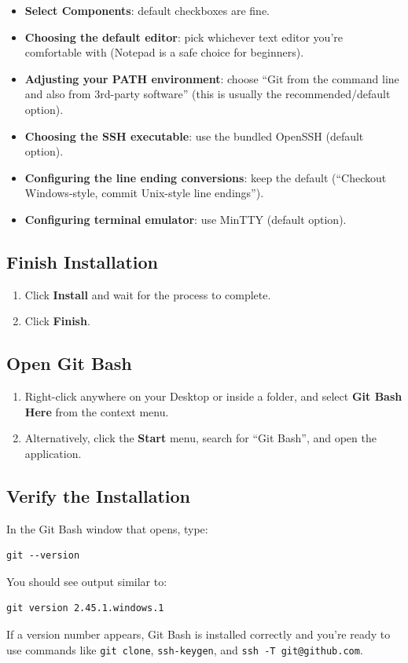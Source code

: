 \documentclass[main.tex]{subfiles}
\begin{document}
\begin{itemize}[leftmargin=*]
    \item \textbf{Select Components}: default checkboxes are fine.
    \item \textbf{Choosing the default editor}: pick whichever text
    editor you're comfortable with (Notepad is a safe choice for
    beginners).
    \item \textbf{Adjusting your PATH environment}: choose
    ``Git from the command line and also from 3rd-party software''
    (this is usually the recommended/default option).
    \item \textbf{Choosing the SSH executable}: use the bundled
    OpenSSH (default option).
    \item \textbf{Configuring the line ending conversions}: keep the
    default (``Checkout Windows-style, commit Unix-style line
    endings'').
    \item \textbf{Configuring terminal emulator}: use MinTTY
    (default option).
\end{itemize}

\subsection{Finish Installation}
\begin{enumerate}[leftmargin=*]
    \item Click \textbf{Install} and wait for the process to complete.
    \item Click \textbf{Finish}.
\end{enumerate}

\subsection{Open Git Bash}
\begin{enumerate}[leftmargin=*]
    \item Right-click anywhere on your Desktop or inside a folder,
    and select \textbf{Git Bash Here} from the context menu.
    \item Alternatively, click the \textbf{Start} menu, search for
    ``Git Bash'', and open the application.
\end{enumerate}

\subsection{Verify the Installation}
In the Git Bash window that opens, type:

\begin{lstlisting}
git --version
\end{lstlisting}

You should see output similar to:

\begin{lstlisting}
git version 2.45.1.windows.1
\end{lstlisting}

If a version number appears, Git Bash is installed correctly and
you're ready to use commands like \texttt{git clone},
\texttt{ssh-keygen}, and \texttt{ssh -T git@github.com}.
\end{document}
